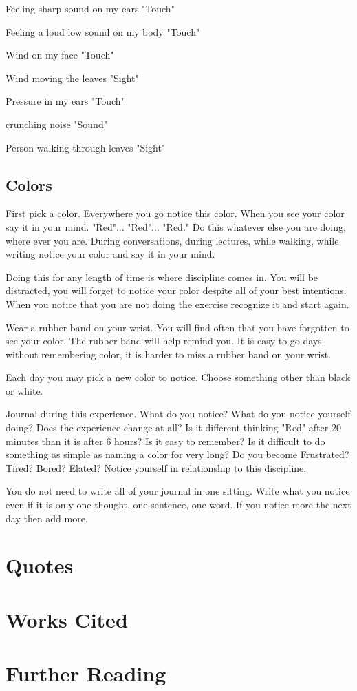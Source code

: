 Feeling sharp sound on my ears "Touch"

Feeling a loud low sound on my body "Touch" 
 

Wind on my face "Touch"

Wind moving the leaves "Sight"

Pressure in my ears "Touch"

crunching noise "Sound"

Person walking through leaves "Sight"

\subsection{Colors}

First pick a color.  Everywhere you go notice this color.  When you see your color say it in your mind.  "Red"... "Red"... "Red."  Do this whatever else you are doing, where ever you are.  During conversations, during lectures, while walking, while writing notice your color and say it in your mind.  
 
Doing this for any length of time is where discipline comes in.  You will be distracted, you will forget to notice your color despite all of your best intentions.  When you notice that you are not doing the exercise recognize it and start again.  
 
Wear a rubber band on your wrist.  You will find often that you have forgotten to see your color.  The rubber band will help remind you.  It is easy to go days without remembering color, it is harder to miss a rubber band on your wrist.  
 
Each day you may pick a new color to notice.  Choose something other than black or white. 
 
 
 
Journal during this experience.   
What do you notice?   
What do you notice yourself doing? 
Does the experience change at all?  Is it different thinking "Red" after 20 minutes than it is after 6 hours?  
Is it easy to remember? 
Is it difficult to do something as simple as naming a color for very long? 
Do you become Frustrated?  Tired?  Bored?  Elated? 
Notice yourself in relationship to this discipline. 
 
 
You do not need to write all of your journal in one sitting.  Write what you notice even if it is only one thought, one sentence, one word.  If you notice more the next day then add more.

\section{Quotes}

\section{Works Cited}

\section{Further Reading}

